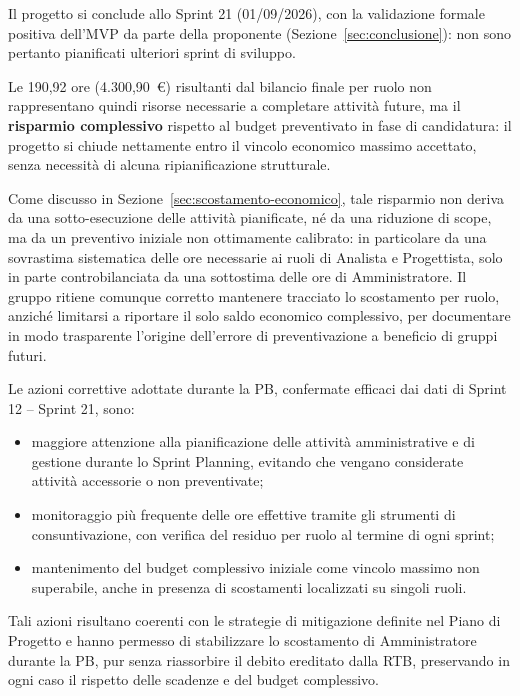 Il progetto si conclude allo Sprint 21 (01/09/2026), con la validazione
formale positiva dell'MVP da parte della proponente (Sezione~\ref{sec:conclusione}):
non sono pertanto pianificati ulteriori sprint di sviluppo. 

Le 190,92 ore
(4.300,90~\euro) risultanti dal bilancio finale per ruolo non
rappresentano quindi risorse necessarie a completare attività future, ma il
\textbf{risparmio complessivo} rispetto al budget preventivato in fase di
candidatura: il progetto si chiude nettamente entro il vincolo economico
massimo accettato, senza necessità di alcuna ripianificazione strutturale.

Come discusso in Sezione~\ref{sec:scostamento-economico}, tale risparmio non
deriva da una sotto-esecuzione delle attività pianificate, né da una
riduzione di scope, ma da un preventivo iniziale non ottimamente calibrato:
in particolare da una sovrastima sistematica delle ore necessarie ai ruoli
di Analista e Progettista, solo in parte controbilanciata da una
sottostima delle ore di Amministratore. Il gruppo ritiene comunque corretto
mantenere tracciato lo scostamento per ruolo, anziché limitarsi a riportare
il solo saldo economico complessivo, per documentare in modo trasparente
l'origine dell'errore di preventivazione a beneficio di gruppi futuri.

Le azioni correttive adottate durante la PB, confermate efficaci dai dati di
Sprint 12 -- Sprint 21, sono:
\begin{itemize}
    \item maggiore attenzione alla pianificazione delle attività amministrative e
    di gestione durante lo Sprint Planning, evitando che vengano considerate
    attività accessorie o non preventivate;
    \item monitoraggio più frequente delle ore effettive tramite gli strumenti di
    consuntivazione, con verifica del residuo per ruolo al termine di ogni sprint;
    \item mantenimento del budget complessivo iniziale come vincolo massimo non
    superabile, anche in presenza di scostamenti localizzati su singoli ruoli.
\end{itemize}

Tali azioni risultano coerenti con le strategie di mitigazione definite nel
Piano di Progetto e hanno permesso di stabilizzare lo scostamento di
Amministratore durante la PB, pur senza riassorbire il debito ereditato dalla
RTB, preservando in ogni caso il rispetto delle scadenze e del budget
complessivo.

